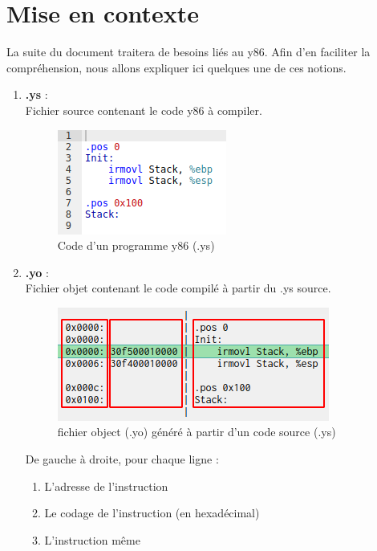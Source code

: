 \documentclass[french]{article}
\begin{document}
\section{Mise en contexte}

La suite du document traitera de besoins liés au y86. Afin d'en faciliter la compréhension, nous allons expliquer ici quelques une de ces notions.

\begin{enumerate}
    \item \textbf{.ys} :\\
    Fichier source contenant le code y86 à compiler.
    \begin{figure}[H]
        \centering
        \includegraphics{img/ex_ys.png}
        \caption{Code d'un programme y86 (.ys)}
        \label{fig:ex_yo}
    \end{figure}
    
    \item \textbf{.yo} :\\
    Fichier objet contenant le code compilé à partir du .ys source.\\
    \begin{figure}[H]
        \centering
        \includegraphics{img/ex_yo.png}
        \caption{fichier object (.yo) généré à partir d'un code source (.ys)}
        \label{fig:ex_yo}
    \end{figure}
    De gauche à droite, pour chaque ligne :
    \begin{enumerate}
        \item L'adresse de l'instruction
        \item Le codage de l'instruction (en hexadécimal)
        \item L'instruction même
    \end{enumerate}
    

\end{enumerate}
\end{document}
